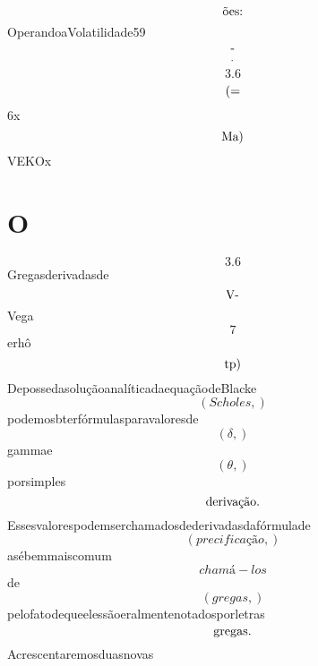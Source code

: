 \documentclass{article}
\begin{document}
\begin{equation}
$ões:$
\end{equation}OperandoaVolatilidade59\begin{equation}
$-$
\end{equation}\begin{equation}
$.$
\end{equation}\begin{equation}
3.6
\end{equation}\begin{equation}
$(=$
\end{equation}6x\begin{equation}
$Ma)$
\end{equation}VEKOx\section{O}\begin{equation}
3.6
\end{equation}Gregasderivadasde\begin{equation}
$V-$
\end{equation}Vega\begin{equation}
7
\end{equation}erhô\begin{equation}
$tp)$
\end{equation}DepossedasoluçãoanalíticadaequaçãodeBlacke\begin{equation}
\left( Scholes,\right)
\end{equation}podemosbterfórmulasparavaloresde\begin{equation}
\left( \delta,\right)
\end{equation}gammae\begin{equation}
\left( \theta,\right)
\end{equation}porsimples\begin{equation}
$derivação.$
\end{equation}Essesvalorespodemserchamadosdederivadasdafórmulade\begin{equation}
\left( precificação,\right)
\end{equation}asébemmaiscomum\begin{equation}
chamá - los
\end{equation}de\begin{equation}
\left( gregas,\right)
\end{equation}pelofatodequeelessãoeralmentenotadosporletras\begin{equation}
$gregas.$
\end{equation}Acrescentaremosduasnovas\begin{equation}

\end{equation}
\end{document}
